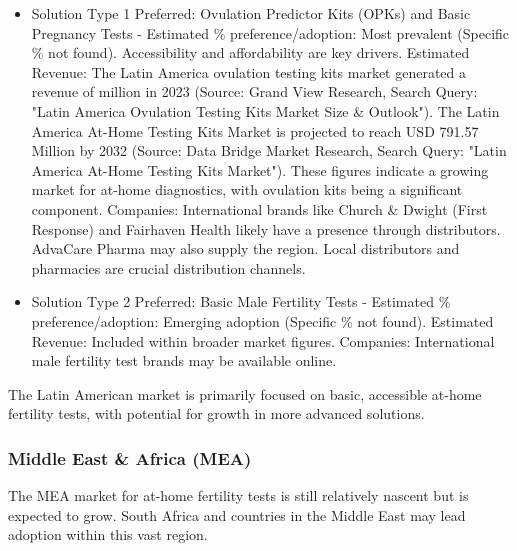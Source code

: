 \documentclass{article}
\begin{document}
\begin{itemize}
  \item Solution Type 1 Preferred: Ovulation Predictor Kits (OPKs) and Basic Pregnancy Tests - Estimated \% preference/adoption: Most prevalent (Specific \% not found). Accessibility and affordability are key drivers.
    Estimated Revenue: The Latin America ovulation testing kits market generated a revenue of  million in 2023 (Source: Grand View Research, Search Query: "Latin America Ovulation Testing Kits Market Size \& Outlook"). The Latin America At-Home Testing Kits Market is projected to reach USD 791.57 Million by 2032 (Source: Data Bridge Market Research, Search Query: "Latin America At-Home Testing Kits Market"). These figures indicate a growing market for at-home diagnostics, with ovulation kits being a significant component.
    Companies: International brands like Church \& Dwight (First Response) and Fairhaven Health likely have a presence through distributors. AdvaCare Pharma may also supply the region. Local distributors and pharmacies are crucial distribution channels.
  \item Solution Type 2 Preferred: Basic Male Fertility Tests - Estimated \% preference/adoption: Emerging adoption (Specific \% not found).
    Estimated Revenue: Included within broader market figures.
    Companies: International male fertility test brands may be available online.
\end{itemize}
The Latin American market is primarily focused on basic, accessible at-home fertility tests, with potential for growth in more advanced solutions.

\subsubsection{Middle East \& Africa (MEA)}
The MEA market for at-home fertility tests is still relatively nascent but is expected to grow. South Africa and countries in the Middle East may lead adoption within this vast region.
\end{document}
